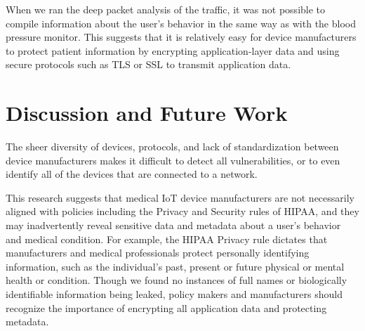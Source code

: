 When we ran the deep packet analysis of the traffic, it was not
possible to compile information about the user's behavior in the same way as
with the blood pressure monitor. This suggests that it is relatively easy for
device manufacturers to protect patient information by encrypting
application-layer data and using secure protocols such as TLS or SSL to
transmit application data.





\section{Discussion and Future Work}

The sheer diversity of devices, protocols, and lack of standardization between device manufacturers makes it difficult to detect all vulnerabilities, or to even identify all of the devices that are connected to a network.

This research suggests that medical IoT device manufacturers are not necessarily aligned with policies including the Privacy and Security rules of HIPAA, and they may inadvertently reveal sensitive data and metadata about a user's behavior and medical condition. For example, the HIPAA Privacy rule dictates that manufacturers and medical professionals protect personally identifying information, such as the individual's past, present or future physical or mental health or condition. Though we found no instances of full names or biologically identifiable information being leaked, policy makers and manufacturers should recognize the importance of encrypting all application data and protecting metadata.

